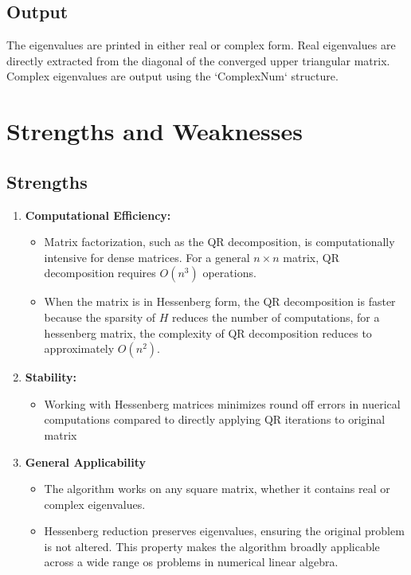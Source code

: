 \documentclass[a4paper,11pt,oneside]{report}
\begin{document}
\section{ Output}
The eigenvalues are printed in either real or complex form. Real eigenvalues are directly extracted from the diagonal of the converged upper triangular matrix. Complex eigenvalues are output using the `ComplexNum` structure.

\chapter{ Strengths and Weaknesses}

\section{ Strengths}
\begin{enumerate}
\item  \textbf{Computational Efficiency:}
    \begin{itemize}
        \item Matrix factorization, such as the QR decomposition, is computationally intensive for dense matrices. For a general $n \times n$ matrix, QR decomposition requires $O(n^3)$ operations.
        \item When the matrix is in Hessenberg form, the QR decomposition is faster because the sparsity of $H$ reduces the number of computations, for a hessenberg matrix, the complexity of QR decomposition reduces to approximately $O(n^2)$.
    \end{itemize}
  
\item  \textbf{Stability:}
\begin{itemize}
    \item Working with Hessenberg matrices minimizes round off errors in nuerical computations compared to directly applying QR iterations to original matrix
\end{itemize}

\item \textbf{General Applicability}
\begin{itemize}
    \item The algorithm works on any square matrix, whether it contains real or complex eigenvalues.
    \item Hessenberg reduction preserves eigenvalues, ensuring the original problem is not altered. This property makes the algorithm broadly applicable across a wide range os problems in numerical linear algebra.
\end{itemize}


\end{enumerate}
\end{document}
